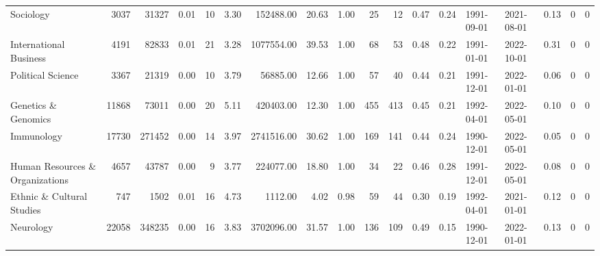 \begin{tabular}{lrrrrrrrrrrrrllrrr}
                      Sociology &   3037 &  31327 &     0.01 &        10 &      3.30 &  152488.00 &      20.63 &  1.00 &       25 &          12 &        0.47 &          0.24 & 1991-09-01 & 2021-08-01 &            0.13 &         0 &      0 \\
         International Business &   4191 &  82833 &     0.01 &        21 &      3.28 & 1077554.00 &      39.53 &  1.00 &       68 &          53 &        0.48 &          0.22 & 1991-01-01 & 2022-10-01 &            0.31 &         0 &      0 \\
              Political Science &   3367 &  21319 &     0.00 &        10 &      3.79 &   56885.00 &      12.66 &  1.00 &       57 &          40 &        0.44 &          0.21 & 1991-12-01 & 2022-01-01 &            0.06 &         0 &      0 \\
            Genetics \& Genomics &  11868 &  73011 &     0.00 &        20 &      5.11 &  420403.00 &      12.30 &  1.00 &      455 &         413 &        0.45 &          0.21 & 1992-04-01 & 2022-05-01 &            0.10 &         0 &      0 \\
                     Immunology &  17730 & 271452 &     0.00 &        14 &      3.97 & 2741516.00 &      30.62 &  1.00 &      169 &         141 &        0.44 &          0.24 & 1990-12-01 & 2022-05-01 &            0.05 &         0 &      0 \\
Human Resources \& Organizations &   4657 &  43787 &     0.00 &         9 &      3.77 &  224077.00 &      18.80 &  1.00 &       34 &          22 &        0.46 &          0.28 & 1991-12-01 & 2022-05-01 &            0.08 &         0 &      0 \\
      Ethnic \& Cultural Studies &    747 &   1502 &     0.01 &        16 &      4.73 &    1112.00 &       4.02 &  0.98 &       59 &          44 &        0.30 &          0.19 & 1992-04-01 & 2021-01-01 &            0.12 &         0 &      0 \\
                      Neurology &  22058 & 348235 &     0.00 &        16 &      3.83 & 3702096.00 &      31.57 &  1.00 &      136 &         109 &        0.49 &          0.15 & 1990-12-01 & 2022-01-01 &            0.13 &         0 &      0 \\
\bottomrule
\end{tabular}
